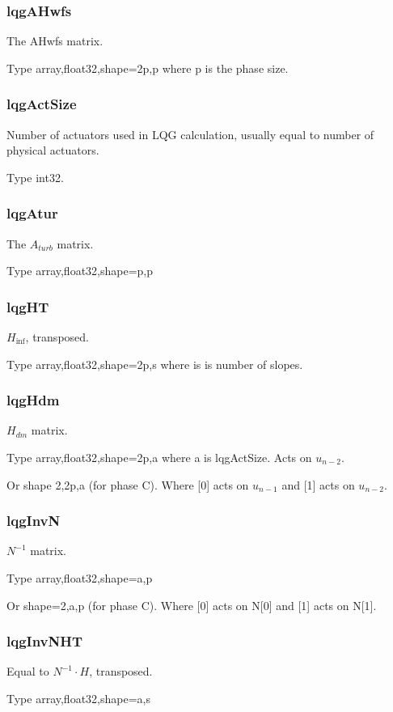\documentclass[a4,10pt]{article}
\begin{document}
\subsubsection{lqgAHwfs}
The AHwfs matrix.

Type array,float32,shape=2p,p where p is the phase size.

\subsubsection{lqgActSize}
Number of actuators used in LQG calculation, usually equal to number
of physical actuators.

Type int32.

\subsubsection{lqgAtur}
The $A_{turb}$ matrix.

Type array,float32,shape=p,p

\subsubsection{lqgHT}
$H_{\inf}$, transposed.

Type array,float32,shape=2p,s where is is number of slopes.

\subsubsection{lqgHdm}
$H_{dm}$ matrix.

Type array,float32,shape=2p,a where a is lqgActSize.  Acts on $u_{n-2}$.

Or shape 2,2p,a (for phase C). Where [0] acts on $u_{n-1}$ and [1]
acts on $u_{n-2}$.

\subsubsection{lqgInvN}
$N^{-1}$ matrix.

Type array,float32,shape=a,p 

Or shape=2,a,p (for phase C).  Where [0] acts on N[0] and [1] acts on N[1].

\subsubsection{lqgInvNHT}
Equal to $N^{-1}\cdot H$, transposed.

Type array,float32,shape=a,s
\end{document}
